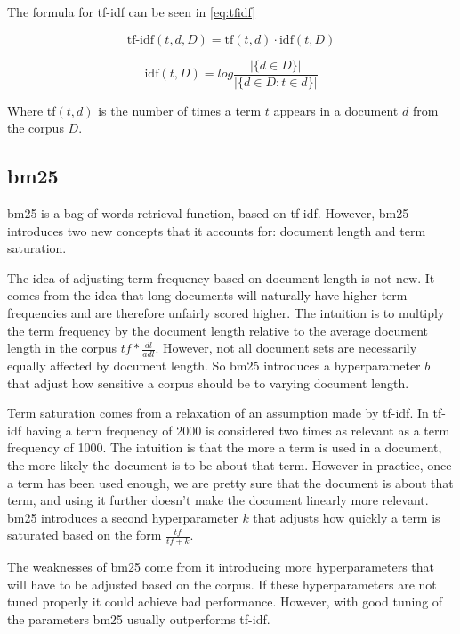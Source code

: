 The formula for \gls{tf-idf} can be seen in \autoref{eq:tfidf}

\begin{equation}\label{eq:tfidf}
	\text{tf-idf}(t, d, D) = \text{tf}(t, d) \cdot \text{idf}(t, D)
\end{equation}

\begin{equation}\label{eq:idf}
	\text{idf}(t,D) = log \frac{|\{d \in D\}|}{|\{d \in D : t \in d\}|}
\end{equation}
	
Where tf$(t, d)$ is the number of times a term $t$ appears in a document $d$ from the corpus $D$.


\subsection{\acrlong{bm25}}
\gls{bm25} is a bag of words retrieval function, based on \gls{tf-idf}.
However, \gls{bm25} introduces two new concepts that it accounts for: document length and term saturation.

The idea of adjusting term frequency based on document length is not new. 
It comes from the idea that long documents will naturally have higher term frequencies and are therefore unfairly scored higher.
The intuition is to multiply the term frequency by the document length relative to the average document length in the corpus $tf * \frac{dl}{adl}$.
However, not all document sets are necessarily equally affected by document length.
So \gls{bm25} introduces a hyperparameter $b$ that adjust how sensitive a corpus should be to varying document length.

Term saturation comes from a relaxation of an assumption made by \gls{tf-idf}.
In \gls{tf-idf} having a term frequency of 2000 is considered two times as relevant as a term frequency of 1000.
The intuition is that the more a term is used in a document, the more likely the document is to be about that term.
However in practice, once a term has been used enough, we are pretty sure that the document is about that term, and using it further doesn't make the document linearly more relevant.
\gls{bm25} introduces a second hyperparameter $k$ that adjusts how quickly a term is saturated based on the form $\frac{tf}{tf+k}$.

The weaknesses of \gls{bm25} come from it introducing more hyperparameters that will have to be adjusted based on the corpus.
If these hyperparameters are not tuned properly it could achieve bad performance.
However, with good tuning of the parameters \gls{bm25} usually outperforms \gls{tf-idf}.

